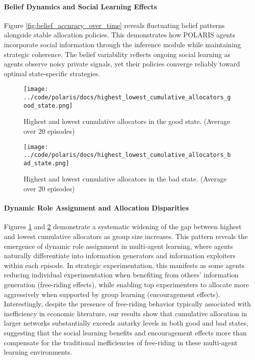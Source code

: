 \paragraph{Belief Dynamics and Social Learning Effects} Figure \ref{fig:belief_accuracy_over_time} reveals fluctuating belief patterns alongside stable allocation policies. This demonstrates how POLARIS agents incorporate social information through the inference module while maintaining strategic coherence. The belief variability reflects ongoing social learning as agents observe noisy private signals, yet their policies converge reliably toward optimal state-specific strategies.

\begin{figure}[!htbp]
    \centering
        \texttt{[image: ../code/polaris/docs/highest\_lowest\_cumulative\_allocators\_good\_state.png]}
        \caption{Highest and lowest cumulative allocators in the good state. (Average over 20 episodes)}
        \label{fig:highest_lowest_cumulative_allocators_good_state}
\end{figure}

\begin{figure}[!htbp]
    \centering
    \texttt{[image: ../code/polaris/docs/highest\_lowest\_cumulative\_allocators\_bad\_state.png]}
    \caption{Highest and lowest cumulative allocators in the bad state. (Average over 20 episodes)}
    \label{fig:highest_lowest_cumulative_allocators_bad_state}
\end{figure}

\paragraph{Dynamic Role Assignment and Allocation Disparities} Figures \ref{fig:highest_lowest_cumulative_allocators_good_state} and \ref{fig:highest_lowest_cumulative_allocators_bad_state} demonstrate a systematic widening of the gap between highest and lowest cumulative allocators as group size increases. This pattern reveals the emergence of dynamic role assignment in multi-agent learning, where agents naturally differentiate into information generators and information exploiters within each episode. In strategic experimentation, this manifests as some agents reducing individual experimentation when benefiting from others' information generation (free-riding effects), while enabling top experimenters to allocate more aggressively when supported by group learning (encouragement effects). Interestingly, despite the presence of free-riding behavior typically associated with inefficiency in economic literature, our results show that cumulative allocation in larger networks substantially exceeds autarky levels in both good and bad states, suggesting that the social learning benefits and encouragement effects more than compensate for the traditional inefficiencies of free-riding in these multi-agent learning environments.

